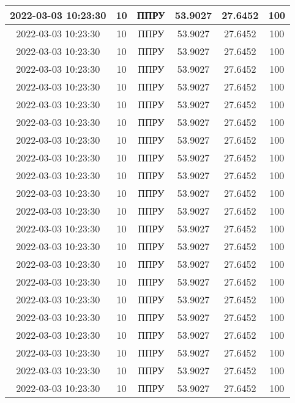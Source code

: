 ﻿\documentclass[a4paper]{article}
\begin{document}
\begin{center}
\begin{longtable}{|c|c|c|c|c|c|}
            2022-03-03 10:23:30 & 10 & ППРУ & 53.9027 & 27.6452 & 100 \\ \hline
            2022-03-03 10:23:30 & 10 & ППРУ & 53.9027 & 27.6452 & 100 \\ \hline
            2022-03-03 10:23:30 & 10 & ППРУ & 53.9027 & 27.6452 & 100 \\ \hline
            2022-03-03 10:23:30 & 10 & ППРУ & 53.9027 & 27.6452 & 100 \\ \hline
            2022-03-03 10:23:30 & 10 & ППРУ & 53.9027 & 27.6452 & 100 \\ \hline
            2022-03-03 10:23:30 & 10 & ППРУ & 53.9027 & 27.6452 & 100 \\ \hline
            2022-03-03 10:23:30 & 10 & ППРУ & 53.9027 & 27.6452 & 100 \\ \hline
            2022-03-03 10:23:30 & 10 & ППРУ & 53.9027 & 27.6452 & 100 \\ \hline
            2022-03-03 10:23:30 & 10 & ППРУ & 53.9027 & 27.6452 & 100 \\ \hline
            2022-03-03 10:23:30 & 10 & ППРУ & 53.9027 & 27.6452 & 100 \\ \hline
            2022-03-03 10:23:30 & 10 & ППРУ & 53.9027 & 27.6452 & 100 \\ \hline
            2022-03-03 10:23:30 & 10 & ППРУ & 53.9027 & 27.6452 & 100 \\ \hline
            2022-03-03 10:23:30 & 10 & ППРУ & 53.9027 & 27.6452 & 100 \\ \hline
            2022-03-03 10:23:30 & 10 & ППРУ & 53.9027 & 27.6452 & 100 \\ \hline
            2022-03-03 10:23:30 & 10 & ППРУ & 53.9027 & 27.6452 & 100 \\ \hline
            2022-03-03 10:23:30 & 10 & ППРУ & 53.9027 & 27.6452 & 100 \\ \hline
            2022-03-03 10:23:30 & 10 & ППРУ & 53.9027 & 27.6452 & 100 \\ \hline
            2022-03-03 10:23:30 & 10 & ППРУ & 53.9027 & 27.6452 & 100 \\ \hline
            2022-03-03 10:23:30 & 10 & ППРУ & 53.9027 & 27.6452 & 100 \\ \hline
            2022-03-03 10:23:30 & 10 & ППРУ & 53.9027 & 27.6452 & 100 \\ \hline
            2022-03-03 10:23:30 & 10 & ППРУ & 53.9027 & 27.6452 & 100 \\ \hline
            2022-03-03 10:23:30 & 10 & ППРУ & 53.9027 & 27.6452 & 100 \\ \hline

\end{longtable}
\end{center}
\end{document}
